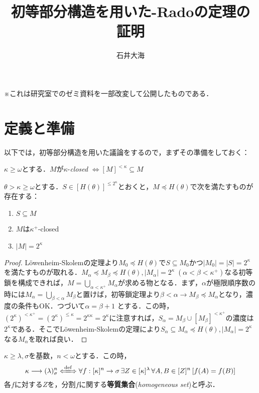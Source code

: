 \documentclass[a4paper]{bxjsarticle}
\title{初等部分構造を用いた\Erdos-Radoの定理の証明}
\author{石井大海}
\begin{document}
\maketitle

※これは研究室でのゼミ資料を一部改変して公開したものである．
\section{定義と準備}
以下では，初等部分構造を用いた議論をするので，まずその準備をしておく：
\begin{definition}
 $\kappa \geq \omega$とする．$M$が$\kappa$-{\itshape closed} $\Leftrightarrow [M]^{<\kappa} \subseteq M$
\end{definition}

\begin{lemma}\label{lem:LS-generalized}
 $\theta > \kappa \geq \omega$とする．$S \in [H(\theta)]^{\leq 2^\kappa}$とおくと，$M \preccurlyeq H(\theta)$で次を満たすものが存在する：
 \begin{enumerate}
  \item $S \subseteq M$
  \item $M$は$\kappa^+$-closed
  \item $|M| = 2^\kappa$
 \end{enumerate}
\end{lemma}
\begin{proof}
 L\"{o}wenheim-Skolemの定理より$M_0 \preccurlyeq H(\theta)$で$S \subseteq M_0$かつ$|M_0| = |S| = 2^\kappa$を満たすものが取れる．$M_\alpha \preccurlyeq M_\beta \preccurlyeq H(\theta), |M_\alpha| = 2^\kappa\; (\alpha < \beta < \kappa^+)$なる初等鎖を構成できれば，$M = \bigcup_{\alpha < \kappa^+} M_\alpha$が求める物となる．まず，$\alpha$が極限順序数の時には$M_\alpha = \bigcup_{\beta < \alpha} M_\beta$と置けば，初等鎖定理より$\beta < \alpha \rightarrow M_\beta \preccurlyeq M_\alpha$となり，濃度の条件もOK．つづいて$\alpha = \beta + 1$ とする．この時，$(2^{\kappa})^{<\kappa^+} =(2^\kappa)^{\leq \kappa} = 2^{\kappa \kappa} = 2^\kappa$に注意すれば，$S_\alpha = M_\beta \cup [M_\beta]^{<\kappa^+}$の濃度は$2^\kappa$である．そこでL\"{o}wenheim-Skolemの定理により$S_\alpha \subseteq M_\alpha \preccurlyeq H(\theta), |M_\alpha| = 2^\kappa$なる$M_\alpha$を取れば良い．\mbox{}
\end{proof}
\begin{definition}
 $\kappa \geq \lambda, \sigma$を基数，$n<\omega$とする．この時，
 \[
 \kappa \longrightarrow (\lambda)^n_\sigma
 \defs \forall f: [\kappa]^n \to \sigma\, \exists Z \in [\kappa]^\lambda\, \forall A, B \in [Z]^n \left[ f(A) = f(B)\right]
 \]
 各$f$に対する$Z$を，分割$f$に関する{\bfseries 等質集合}({\itshape homogeneous set})と呼ぶ．
\end{definition}
\end{document}
